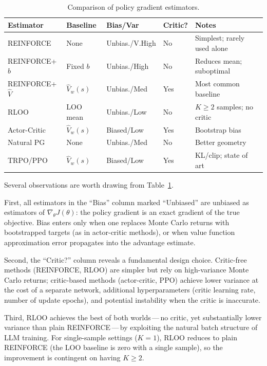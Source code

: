 \begin{table}[ht]
\centering
\caption{Comparison of policy gradient estimators.}
\label{tab:pg-comparison}
\small
\begin{tabular}{@{}llllp{3.2cm}@{}}
\toprule
\textbf{Estimator} & \textbf{Baseline} & \textbf{Bias/Var} & \textbf{Critic?} & \textbf{Notes} \\
\midrule
REINFORCE & None & Unbias./V.High & No & Simplest; rarely used alone \\
\addlinespace
REINFORCE+$b$ & Fixed $b$ & Unbias./High & No & Reduces mean; suboptimal \\
\addlinespace
REINFORCE+$\hat V$ & $\hat V_w(s)$ & Unbias./Med & Yes & Most common baseline \\
\addlinespace
RLOO & LOO mean & Unbias./Low & No & $K\!\geq\!2$ samples; no critic \\
\addlinespace
Actor-Critic & $\hat V_w(s)$ & Biased/Low & Yes & Bootstrap bias \\
\addlinespace
Natural PG & None & Unbias./Med & No & Better geometry \\
\addlinespace
TRPO/PPO & $\hat V_w(s)$ & Biased/Low & Yes & KL/clip; state of art \\
\bottomrule
\end{tabular}
\end{table}

Several observations are worth drawing from Table~\ref{tab:pg-comparison}.

First, all estimators in the ``Bias'' column marked ``Unbiased'' are unbiased as estimators of $\nabla_\theta J(\theta)$: the policy gradient is an exact gradient of the true objective.  Bias enters only when one replaces Monte Carlo returns with bootstrapped targets (as in actor-critic methods), or when value function approximation error propagates into the advantage estimate.

Second, the ``Critic?'' column reveals a fundamental design choice.  Critic-free methods (REINFORCE, RLOO) are simpler but rely on high-variance Monte Carlo returns; critic-based methods (actor-critic, PPO) achieve lower variance at the cost of a separate network, additional hyperparameters (critic learning rate, number of update epochs), and potential instability when the critic is inaccurate.

Third, RLOO achieves the best of both worlds\,---\,no critic, yet substantially lower variance than plain REINFORCE\,---\,by exploiting the natural batch structure of LLM training.  For single-sample settings ($K=1$), RLOO reduces to plain REINFORCE (the LOO baseline is zero with a single sample), so the improvement is contingent on having $K \geq 2$.

